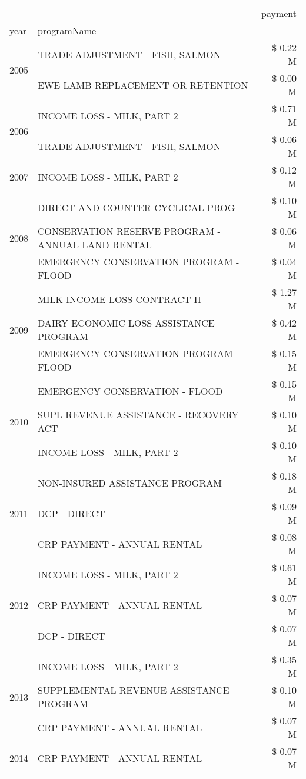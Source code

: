 \begin{tabular}{llr}
\toprule
 &  & payment \\
year & programName &  \\
\midrule
\multirow[t]{2}{*}{2005} & TRADE ADJUSTMENT - FISH, SALMON & \$ 0.22 M \\
 & EWE LAMB REPLACEMENT OR RETENTION & \$ 0.00 M \\
\cline{1-3}
\multirow[t]{2}{*}{2006} & INCOME LOSS - MILK, PART 2 & \$ 0.71 M \\
 & TRADE ADJUSTMENT - FISH, SALMON & \$ 0.06 M \\
\cline{1-3}
2007 & INCOME LOSS - MILK, PART 2 & \$ 0.12 M \\
\cline{1-3}
\multirow[t]{3}{*}{2008} & DIRECT AND COUNTER CYCLICAL PROG & \$ 0.10 M \\
 & CONSERVATION RESERVE PROGRAM - ANNUAL LAND RENTAL & \$ 0.06 M \\
 & EMERGENCY CONSERVATION PROGRAM - FLOOD & \$ 0.04 M \\
\cline{1-3}
\multirow[t]{3}{*}{2009} & MILK INCOME LOSS CONTRACT II & \$ 1.27 M \\
 & DAIRY ECONOMIC LOSS ASSISTANCE PROGRAM & \$ 0.42 M \\
 & EMERGENCY CONSERVATION PROGRAM - FLOOD & \$ 0.15 M \\
\cline{1-3}
\multirow[t]{3}{*}{2010} & EMERGENCY CONSERVATION - FLOOD & \$ 0.15 M \\
 & SUPL REVENUE ASSISTANCE - RECOVERY ACT & \$ 0.10 M \\
 & INCOME LOSS - MILK, PART 2 & \$ 0.10 M \\
\cline{1-3}
\multirow[t]{3}{*}{2011} & NON-INSURED ASSISTANCE PROGRAM & \$ 0.18 M \\
 & DCP - DIRECT & \$ 0.09 M \\
 & CRP PAYMENT - ANNUAL RENTAL & \$ 0.08 M \\
\cline{1-3}
\multirow[t]{3}{*}{2012} & INCOME LOSS - MILK, PART 2 & \$ 0.61 M \\
 & CRP PAYMENT - ANNUAL RENTAL & \$ 0.07 M \\
 & DCP - DIRECT & \$ 0.07 M \\
\cline{1-3}
\multirow[t]{3}{*}{2013} & INCOME LOSS - MILK, PART 2 & \$ 0.35 M \\
 & SUPPLEMENTAL REVENUE ASSISTANCE PROGRAM & \$ 0.10 M \\
 & CRP PAYMENT - ANNUAL RENTAL & \$ 0.07 M \\
\cline{1-3}
\multirow[t]{3}{*}{2014} & CRP PAYMENT - ANNUAL RENTAL & \$ 0.07 M \\

\end{tabular}
